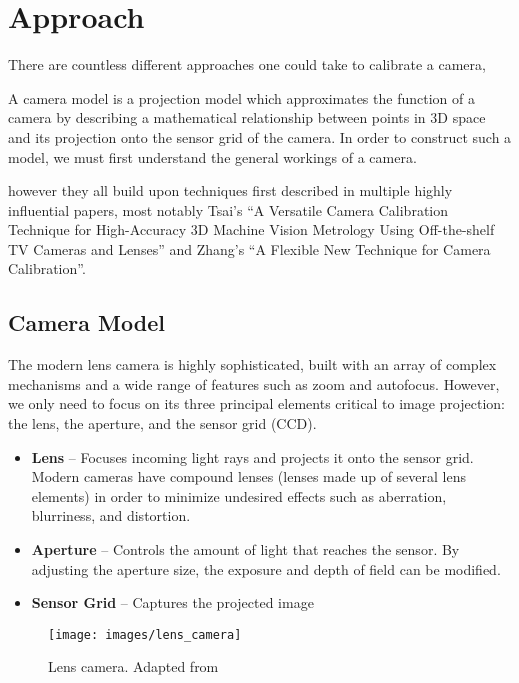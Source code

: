 \section{Approach} 

There are countless different approaches one could take to calibrate a camera, 

A camera model is a projection model which approximates the function of a camera by describing a mathematical relationship between points in 3D space and its projection onto the sensor grid of the camera. In order to construct such a model, we must first understand the general workings of a camera.

however they all build upon techniques first described in multiple highly influential papers, most notably Tsai's ``A Versatile Camera Calibration Technique for High-Accuracy 3D Machine Vision Metrology Using Off-the-shelf TV Cameras and Lenses'' and Zhang's ``A Flexible New Technique for Camera Calibration''. 

\subsection{Camera Model} \label{sec:camera_model}

The modern lens camera is highly sophisticated, built with an array of complex mechanisms and a wide range of features such as zoom and autofocus. However, we only need to focus on its three principal elements critical to image projection: the lens, the aperture, and the sensor grid (CCD). 

\begin{itemize}[leftmargin=!, itemindent=-5ex]
    \item \textbf{Lens} -- Focuses incoming light rays and projects it onto the sensor grid. Modern cameras have compound lenses (lenses made up of several lens elements) in order to minimize undesired effects such as aberration, blurriness, and distortion. 
    \item \textbf{Aperture} -- Controls the amount of light that reaches the sensor. By adjusting the aperture size, the exposure and depth of field can be modified.
    \item \textbf{Sensor Grid} -- Captures the projected image
\end{itemize}

\begin{figure}[H]
    \centering
    \texttt{[image: images/lens\_camera]}
    \caption{Lens camera. Adapted from \cite{coltonPhysics1232012}} \label{fig:lens_camera}
\end{figure}

